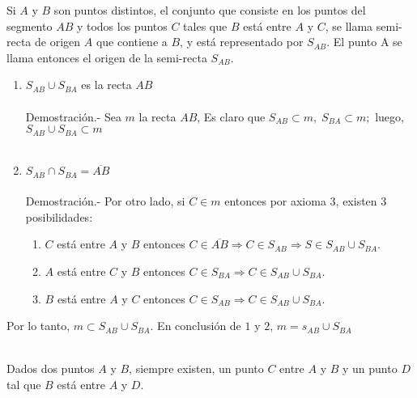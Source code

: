 \begin{tcolorbox}[colframe=white]
    \begin{def.}
	Si $A$ y $B$ son puntos distintos, el conjunto que consiste en los puntos del segmento $AB$ y todos los puntos $C$ tales que $B$ está entre $A$ y $C$, se llama semi-recta de origen $A$ que contiene a $B$, y está representado por $S_{AB}$. El punto A se llama entonces el origen de la semi-recta $S_{AB}$.
    \end{def.}
\end{tcolorbox}

    \begin{proposicion}
	\begin{enumerate}[\bfseries a)]
	    \item $S_{AB} \cup S_{BA}$ es la recta $AB$\\\\
		Demostración.-\; Sea $m$ la recta $AB$, Es claro que $S_{AB} \subset m, \; S_{BA} \subset m;$ luego, $S_{AB} \cup S_{BA} \subset m$\\\\
	    \item $S_{AB} \cap S_{BA}= \overline{AB}$\\\\
		Demostración.-\; Por otro lado, si $C \in m$ entonces por axioma $3$, existen 3 posibilidades:
		\begin{enumerate}[1)]
		    \item $C$ está entre $A$ y $B$ entonces $C \in \overline{AB} \Rightarrow C\in S_{AB} \Rightarrow S\in S_{AB} \cup S_{BA}$.
		    \item $A$ está entre $C$ y $B$ entonces $C \in S_{BA} \Rightarrow C \in S_{AB} \cup S_{BA}$.
		    \item $B$ está entre $A$ y $C$ entonces $C \in S_{AB} \Rightarrow C \in S_{AB} \cup S_{BA}$.
		\end{enumerate}
	\end{enumerate}
	Por lo tanto, $m \subset S_{AB} \cup S_{BA}$. En conclusión de $1$ y $2$, $m=s_{AB} \cup S_{BA}$\\\\
    \end{proposicion}

\begin{tcolorbox}[colframe=white]
    \begin{axioma}
	Dados dos puntos $A$ y $B$, siempre existen, un punto $C$ entre $A$ y $B$ y un punto $D$ tal que $B$ está entre $A$ y $D$.
    \end{axioma}
\end{tcolorbox}

